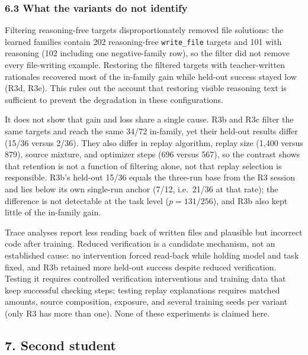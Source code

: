 \documentclass[
  10pt,
]{article}
\begin{document}
\subsubsection{6.3 What the variants do not
identify}\label{what-the-variants-do-not-identify}

Filtering reasoning-free targets disproportionately removed file
solutions: the learned families contain 202 reasoning-free
\texttt{write\_file} targets and 101 with reasoning (102 including one
negative-family row), so the filter did not remove every file-writing
example. Restoring the filtered targets with teacher-written rationales
recovered most of the in-family gain while held-out success stayed low
(R3d, R3e). This rules out the account that restoring visible reasoning
text is sufficient to prevent the degradation in these configurations.

It does not show that gain and loss share a single cause. R3b and R3c
filter the same targets and reach the same 34/72 in-family, yet their
held-out results differ (15/36 versus 2/36). They also differ in replay
algorithm, replay size (1,400 versus 879), source mixture, and optimizer
steps (696 versus 567), so the contrast shows that retention is not a
function of filtering alone, not that replay selection is responsible.
R3b's held-out 15/36 equals the three-run base from the R3 session and
lies below its own single-run anchor (7/12, i.e.~21/36 at that rate);
the difference is not detectable at the task level (\(p=131/256\)), and
R3b also kept little of the in-family gain.

Trace analyses report less reading back of written files and plausible
but incorrect code after training. Reduced verification is a candidate
mechanism, not an established cause: no intervention forced read-back
while holding model and task fixed, and R3b retained more held-out
success despite reduced verification. Testing it requires controlled
verification interventions and training data that keep successful
checking steps; testing replay explanations requires matched amounts,
source composition, exposure, and several training seeds per variant
(only R3 has more than one). None of these experiments is claimed here.

\subsection{7. Second student}\label{second-student}
\end{document}
